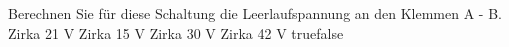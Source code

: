     {Berechnen Sie für diese Schaltung die Leerlaufspannung an den Klemmen A - B.}
    {Zirka 21 V}
    {Zirka 15 V}
    {Zirka 30 V}
    {Zirka 42 V}
    {true}{false}